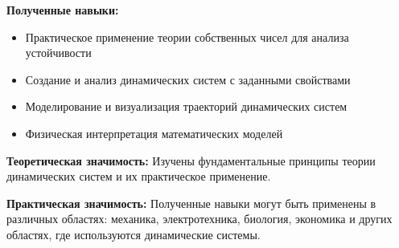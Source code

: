 \textbf{Полученные навыки:}
\begin{itemize}
    \item Практическое применение теории собственных чисел для анализа устойчивости
    \item Создание и анализ динамических систем с заданными свойствами
    \item Моделирование и визуализация траекторий динамических систем
    \item Физическая интерпретация математических моделей
\end{itemize}

\textbf{Теоретическая значимость:} Изучены фундаментальные принципы теории динамических систем и их практическое применение.

\textbf{Практическая значимость:} Полученные навыки могут быть применены в различных областях: механика, электротехника, биология, экономика и других областях, где используются динамические системы.
